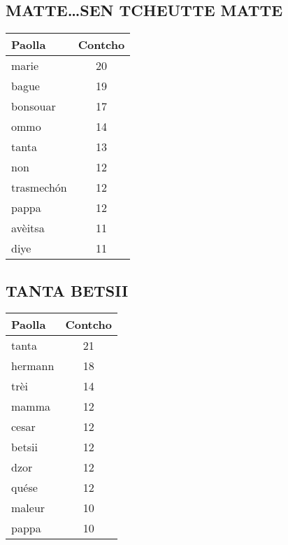 \vspace{1em}
\newpage
\begin{minipage}{0.48\textwidth}
\subsection*{MATTE\ldots SEN TCHEUTTE MATTE}
\begin{tabular}{lc}
\toprule
\textbf{Paolla} & \textbf{Contcho} \\
\midrule
marie & 20 \\
bague & 19 \\
bonsouar & 17 \\
ommo & 14 \\
tanta & 13 \\
non & 12 \\
trasmechón & 12 \\
pappa & 12 \\
avèitsa & 11 \\
diye & 11 \\
\bottomrule
\end{tabular}
\end{minipage}
\hfill
\begin{minipage}{0.48\textwidth}
\subsection*{TANTA BETSII}
\begin{tabular}{lc}
\toprule
\textbf{Paolla} & \textbf{Contcho} \\
\midrule
tanta & 21 \\
hermann & 18 \\
trèi & 14 \\
mamma & 12 \\
cesar & 12 \\
betsii & 12 \\
dzor & 12 \\
quése & 12 \\
maleur & 10 \\
pappa & 10 \\
\bottomrule
\end{tabular}
\end{minipage}





